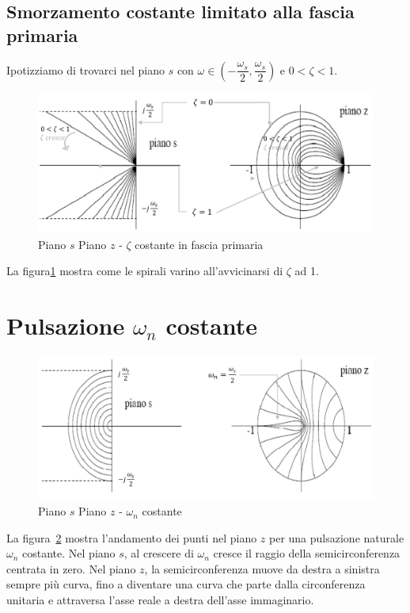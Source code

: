 \documentclass[a4paper]{report}
\begin{document}
\subsection{Smorzamento costante limitato alla fascia primaria}
Ipotizziamo di trovarci nel piano $s$ con $\omega \in \left(
-\dfrac{\omega_s}{2}, \dfrac{\omega_s}{2} \right)$ e $0 < \zeta < 1$.
\begin{figure}[!h]
  \begin{center}
    \includegraphics[scale=0.3]{./figures/pianoSsmorzamentoCostanteCardioide.png}
    \caption{Piano $s$ Piano $z$ - $\zeta$
      costante in fascia primaria}\label{fig:pianoSsmorzamentoCostanteCardioide}
  \end{center}
\end{figure}
La figura\ref{fig:pianoSsmorzamentoCostanteCardioide} mostra come le
spirali varino all'avvicinarsi di $\zeta$ ad 1.

\section{Pulsazione $\omega_n$ costante}
\begin{figure}[!h]
  \begin{center}
    \includegraphics[scale=0.3]{./figures/pianoSpulsazioneNaturaleCostante.png}
    \caption{Piano $s$ Piano $z$ - $\omega_n$
      costante}\label{fig:pianoSpulsazioneNaturaleCostantee}
  \end{center}
\end{figure}
La figura~\ref{fig:pianoSpulsazioneNaturaleCostantee} mostra
l'andamento dei punti nel piano $z$ per una pulsazione naturale
$\omega_n$ costante. Nel piano $s$, al crescere di $\omega_n$ cresce
il raggio della semicirconferenza centrata in zero. Nel piano $z$, la
semicirconferenza muove da destra a sinistra sempre pi\`u curva, fino
a diventare una curva che parte dalla circonferenza unitaria e
attraversa l'asse reale a destra dell'asse immaginario.
\end{document}
